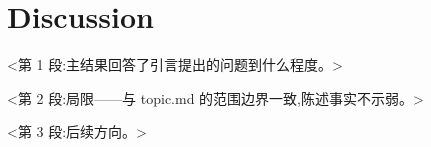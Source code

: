\section{Discussion}\label{sec:discussion}

<第 1 段:主结果回答了引言提出的问题到什么程度。>

<第 2 段:局限——与 topic.md 的范围边界一致,陈述事实不示弱。>

<第 3 段:后续方向。>

